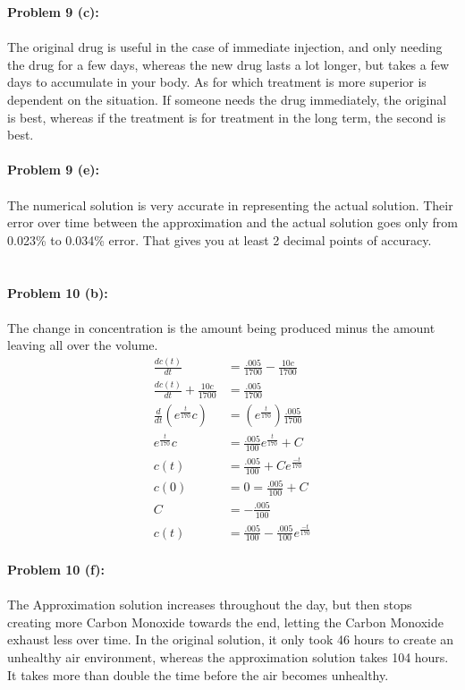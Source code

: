 \documentclass[12pt]{article}
\begin{document}
\newpage
\noindent \textbf{Problem 9 (c): }
\\ \\
The original drug is useful in the case of immediate injection, and only needing the drug for a few days, whereas the new drug lasts a lot longer, but takes a few days to accumulate in your body. As for which treatment is more superior is dependent on the situation. If someone needs the drug immediately, the original is best, whereas if the treatment is for treatment in the long term, the second is best.
\\ \\
\noindent \textbf{Problem 9 (e): }
\\ \\
The numerical solution is very accurate in representing the actual solution.  Their error over time between the approximation and the actual solution goes only from 0.023\% to 0.034\% error. That gives you at least 2 decimal points of accuracy.
\\ \\ \\ 
\noindent \textbf{Problem 10 (b): }
\\ \\
The change in concentration is the amount being produced minus the amount leaving all over the volume.
	\begin{align*}
		\frac{dc(t)}{dt} &= \frac{.005}{1700} - \frac{10c}{1700} \\
		\frac{dc(t)}{dt} + \frac{10c}{1700} &= \frac{.005}{1700} \\
		\frac{d}{dt}(e^{\frac{t}{170}}c) &= (e^{\frac{t}{170}})\frac{.005}{1700} \\
		e^{\frac{t}{170}}c &= \frac{.005}{100}e^{\frac{t}{170}} + C \\
		c(t) &= \frac{.005}{100} + Ce^{\frac{-t}{170}} \\
		c(0) &= 0 = \frac{.005}{100} + C \\
		C &= -\frac{.005}{100} \\
		c(t) &= \frac{.005}{100} - \frac{.005}{100}e^{\frac{-t}{170}} 
	\end{align*}
\\
\noindent \textbf{Problem 10 (f): }
\\ \\
The Approximation solution increases throughout the day, but then stops creating more Carbon Monoxide towards the end, letting the Carbon Monoxide exhaust less over time. In the original solution, it only took 46 hours to create an unhealthy air environment, whereas the approximation solution takes 104 hours. It takes more than double the time before the air becomes unhealthy. 
\end{document}
